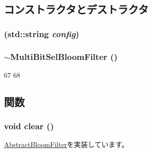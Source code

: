 \subsection{コンストラクタとデストラクタ}
\hypertarget{classMultiBitSelBloomFilter_a348622e24bbf3a3a8094c7780d5f13ba}{
\subsubsection[{MultiBitSelBloomFilter}]{ (std::string {\em config})}}
\label{classMultiBitSelBloomFilter_a348622e24bbf3a3a8094c7780d5f13ba}
\hypertarget{classMultiBitSelBloomFilter_ab58bb7c83be47e72d11876ae2636ab1e}{
\subsubsection[{$\sim$MultiBitSelBloomFilter}]{\setlength{\rightskip}{0pt plus 5cm}$\sim${\bf MultiBitSelBloomFilter} ()}}
\label{classMultiBitSelBloomFilter_ab58bb7c83be47e72d11876ae2636ab1e}



\begin{DoxyCode}
67 {
68 }
\end{DoxyCode}


\subsection{関数}
\hypertarget{classMultiBitSelBloomFilter_ac8bb3912a3ce86b15842e79d0b421204}{
\subsubsection[{clear}]{\setlength{\rightskip}{0pt plus 5cm}void clear ()}}
\label{classMultiBitSelBloomFilter_ac8bb3912a3ce86b15842e79d0b421204}


\hyperlink{classAbstractBloomFilter_a5eeb94d22b8366d1b68d0614384802fe}{AbstractBloomFilter}を実装しています。


